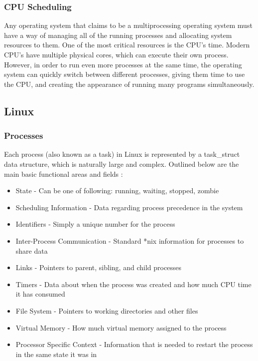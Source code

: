 \documentclass[letterpaper,draftclsnofoot,10pt,onecolumn,titlepage]{IEEEtran}\usepackage[margin=0.75in]{geometry}
\begin{document}
        \subsubsection{CPU Scheduling}
        Any operating system that claims to be a multiprocessing operating system must have a way of managing all of
        the running processes and allocating system resources to them. One of the most critical resources is the CPU's
        time. Modern CPU's have multiple physical cores, which can execute their own process. However, in order to run
        even more processes at the same time, the operating system can quickly switch between different processes, giving
        them time to use the CPU, and creating the appearance of running many programs simultaneously.

    \subsection{Linux}
        \subsubsection{Processes}
        Each process (also known as a task) in Linux is represented by a task\_struct data structure, which is naturally
        large and complex. Outlined below are the main basic functional areas and fields \cite{linuxprocesses}:

        \begin{itemize}
            \item State - Can be one of following: running, waiting, stopped, zombie
            \item Scheduling Information - Data regarding process precedence in the system
            \item Identifiers - Simply a unique number for the process
            \item Inter-Process Communication - Standard *nix information for processes to share data
            \item Links - Pointers to parent, sibling, and child processes
            \item Timers - Data about when the process was created and how much CPU time it has consumed
            \item File System - Pointers to working directories and other files
            \item Virtual Memory - How much virtual memory assigned to the process
            \item Processor Specific Context - Information that is needed to restart the process in the same state it was in
        \end{itemize}
\end{document}
